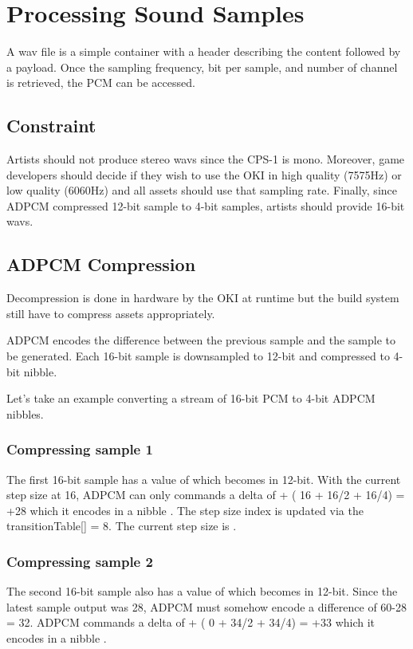 \section{Processing Sound Samples}
A wav file is a simple container with a header describing the content followed by a payload. Once the sampling frequency, bit per sample, and number of channel is retrieved, the PCM can be accessed.

\subsection{Constraint}
Artists should not produce stereo wavs since the CPS-1 is mono. Moreover, game developers should decide if they wish to use the OKI in high quality (7575Hz) or low quality (6060Hz) and all assets should use that sampling rate. Finally, since ADPCM compressed 12-bit sample to 4-bit samples, artists should provide 16-bit wavs.


\subsection{ADPCM Compression}
Decompression is done in hardware by the OKI at runtime but the build system still have to compress assets appropriately. 

ADPCM encodes the difference between the previous sample and the sample to be generated. Each 16-bit sample is downsampled to 12-bit and compressed to 4-bit nibble\cite{adpcm_specs}.





Let's take an example converting a stream of 16-bit PCM to 4-bit ADPCM nibbles.



\subsubsection{Compressing sample 1}
The first 16-bit sample has a value of  which becomes  in 12-bit. With the current step size at 16, ADPCM can only commands a delta of + ( 16 + 16/2 + 16/4) = +28 which it encodes in a nibble . The step size index is updated via the transitionTable[] = 8. The current step size is . 

\subsubsection{Compressing sample 2}
The second 16-bit sample also has a value of  which becomes  in 12-bit. Since the latest sample output was 28, ADPCM must somehow encode a difference of 60-28 = 32. ADPCM commands a delta of + ( 0 + 34/2 + 34/4) = +33 which it encodes in a nibble . 


